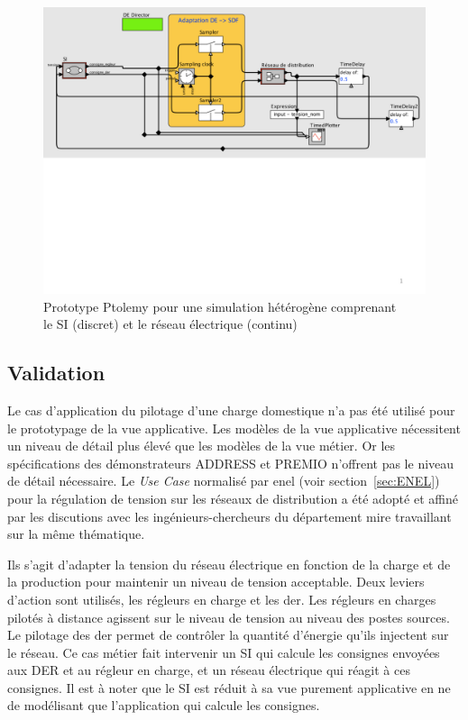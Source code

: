 \begin{figure}[!ht]
  \centering
  \includegraphics[trim = 0cm 8cm 0cm 0cm, clip, width=1\textwidth]{figures/6_methodologie/simu_ptolemy.pdf}
  \caption{Prototype Ptolemy pour une simulation hétérogène comprenant \\
           le SI (discret) et le réseau électrique (continu)}
 \label{fig:simu_ptolemy}
\end{figure}
		
\subsection{Validation}
Le cas d'application du pilotage d'une charge domestique n'a pas été utilisé pour le prototypage de la vue applicative. Les modèles de la vue applicative nécessitent un niveau de détail plus élevé que les modèles de la vue métier. Or les spécifications des démonstrateurs ADDRESS et PREMIO n'offrent pas le niveau de détail nécessaire. Le \textit{Use Case} normalisé par \gls{enel} (voir section~\ref{sec:ENEL}) pour la régulation de tension sur les réseaux de distribution a été adopté et affiné par les discutions avec les ingénieurs-chercheurs du département \gls{mire} travaillant sur la même thématique. 
		
Ils s'agit d'adapter la tension du réseau électrique en fonction de la charge et de la production pour maintenir un niveau de tension acceptable. Deux leviers d'action sont utilisés, les régleurs en charge et les \gls{der}. Les régleurs en charges pilotés à distance agissent sur le niveau de tension au niveau des postes sources. Le pilotage des \gls{der} permet de contrôler la quantité d'énergie qu'ils injectent sur le réseau. Ce cas métier fait intervenir un SI qui calcule les consignes envoyées aux DER et au régleur en charge, et un réseau électrique qui réagit à ces consignes. Il est à noter que le SI est réduit à sa vue purement applicative en ne de modélisant que l'application qui calcule les consignes.
		
